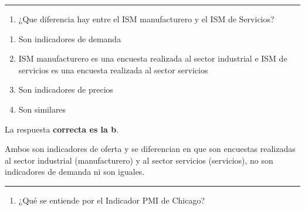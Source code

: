 \documentclass[
  letterpaper,
  DIV=11,
  numbers=noendperiod]{scrreprt}
\providecommand{\tightlist}{%
  \setlength{\itemsep}{0pt}\setlength{\parskip}{0pt}}\usepackage{longtable,booktabs,array}
\begin{document}
\begin{center}\rule{0.5\linewidth}{0.5pt}\end{center}

\begin{enumerate}
\def\labelenumi{\arabic{enumi}.}
\setcounter{enumi}{30}
\tightlist
\item
  ¿Que diferencia hay entre el ISM manufacturero y el ISM de Servicios?
\end{enumerate}

\begin{enumerate}
\def\labelenumi{\alph{enumi})}
\item
  Son indicadores de demanda
\item
  ISM manufacturero es una encuesta realizada al sector industrial e ISM
  de servicios es una encuesta realizada al sector servicios
\item
  Son indicadores de precios
\item
  Son similares
\end{enumerate}

\begin{tcolorbox}[enhanced jigsaw, left=2mm, opacityback=0, colback=white, breakable, arc=.35mm, bottomrule=.15mm, rightrule=.15mm, toprule=.15mm, leftrule=.75mm, colframe=quarto-callout-tip-color-frame]
\begin{minipage}[t]{5.5mm}
\textcolor{quarto-callout-tip-color}{\faLightbulb}
\end{minipage}%
\begin{minipage}[t]{\textwidth - 5.5mm}

La respuesta \textbf{correcta es la b}.

Ambos son indicadores de oferta y se diferencian en que son encuestas
realizadas al sector industrial (manufacturero) y al sector servicios
(servicios), no son indicadores de demanda ni son iguales.

\end{minipage}%
\end{tcolorbox}

\begin{center}\rule{0.5\linewidth}{0.5pt}\end{center}

\begin{enumerate}
\def\labelenumi{\arabic{enumi}.}
\setcounter{enumi}{31}
\tightlist
\item
  ¿Qué se entiende por el Indicador PMI de Chicago?
\end{enumerate}
\end{document}
